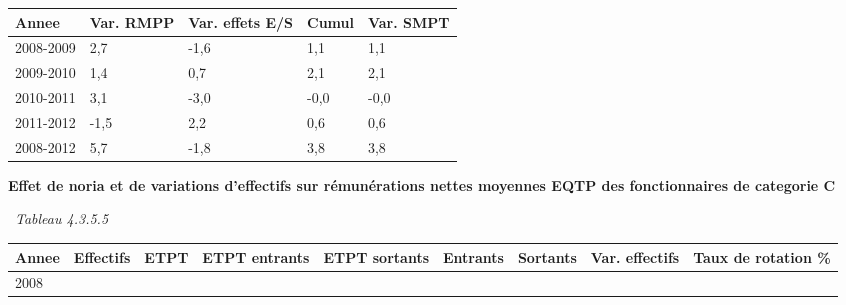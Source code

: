 \begin{longtable}[]{@{}lllll@{}}
\toprule
Annee & Var. RMPP & Var. effets E/S & Cumul & Var. SMPT\tabularnewline
\midrule
\endhead
2008-2009 & 2,7 & -1,6 & 1,1 & 1,1\tabularnewline
2009-2010 & 1,4 & 0,7 & 2,1 & 2,1\tabularnewline
2010-2011 & 3,1 & -3,0 & -0,0 & -0,0\tabularnewline
2011-2012 & -1,5 & 2,2 & 0,6 & 0,6\tabularnewline
2008-2012 & 5,7 & -1,8 & 3,8 & 3,8\tabularnewline
\bottomrule
\end{longtable}

\textbf{Effet de noria et de variations d'effectifs sur rémunérations
nettes moyennes EQTP des fonctionnaires de categorie C}

~\emph{Tableau 4.3.5.5}

\begin{longtable}[]{@{}lllllllll@{}}
\toprule
\begin{minipage}[b]{0.05\columnwidth}\raggedright
Annee\strut
\end{minipage} & \begin{minipage}[b]{0.08\columnwidth}\raggedright
Effectifs\strut
\end{minipage} & \begin{minipage}[b]{0.05\columnwidth}\raggedright
ETPT\strut
\end{minipage} & \begin{minipage}[b]{0.10\columnwidth}\raggedright
ETPT entrants\strut
\end{minipage} & \begin{minipage}[b]{0.10\columnwidth}\raggedright
ETPT sortants\strut
\end{minipage} & \begin{minipage}[b]{0.07\columnwidth}\raggedright
Entrants\strut
\end{minipage} & \begin{minipage}[b]{0.07\columnwidth}\raggedright
Sortants\strut
\end{minipage} & \begin{minipage}[b]{0.11\columnwidth}\raggedright
Var. effectifs\strut
\end{minipage} & \begin{minipage}[b]{0.14\columnwidth}\raggedright
Taux de rotation \%\strut
\end{minipage}\tabularnewline
\midrule
\endhead
\begin{minipage}[t]{0.05\columnwidth}\raggedright
2008\strut
\end{minipage} & \begin{minipage}[t]{0.08\columnwidth}\raggedright

\end{minipage}
\end{longtable}
